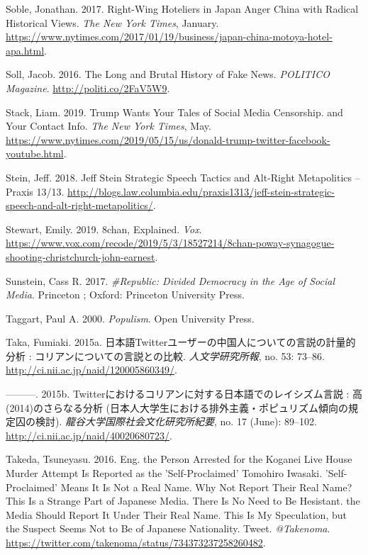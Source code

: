 \documentclass[10pt,british,A4paper,,openany]{memoir}
\begin{document}
\hypertarget{ref-soble_right-wing_2017}{}
Soble, Jonathan. 2017. Right-Wing Hoteliers in Japan Anger China with
Radical Historical Views. \emph{The New York Times}, January.
\url{https://www.nytimes.com/2017/01/19/business/japan-china-motoya-hotel-apa.html}.

\hypertarget{ref-soll_long_2016}{}
Soll, Jacob. 2016. The Long and Brutal History of Fake News.
\emph{POLITICO Magazine}. \url{http://politi.co/2FaV5W9}.

\hypertarget{ref-stack_trump_2019}{}
Stack, Liam. 2019. Trump Wants Your Tales of Social Media Censorship.
and Your Contact Info. \emph{The New York Times}, May.
\url{https://www.nytimes.com/2019/05/15/us/donald-trump-twitter-facebook-youtube.html}.

\hypertarget{ref-stein_jeff_2018}{}
Stein, Jeff. 2018. Jeff Stein Strategic Speech Tactics and Alt-Right
Metapolitics -- Praxis 13/13.
\url{http://blogs.law.columbia.edu/praxis1313/jeff-stein-strategic-speech-and-alt-right-metapolitics/}.

\hypertarget{ref-stewart_8chan_2019}{}
Stewart, Emily. 2019. 8chan, Explained. \emph{Vox}.
\url{https://www.vox.com/recode/2019/5/3/18527214/8chan-poway-synagogue-shooting-christchurch-john-earnest}.

\hypertarget{ref-sunstein_republic:_2017}{}
Sunstein, Cass R. 2017. \emph{\#Republic: Divided Democracy in the Age
of Social Media}. Princeton ; Oxford: Princeton University Press.

\hypertarget{ref-taggart_populism_2000}{}
Taggart, Paul A. 2000. \emph{Populism}. Open University Press.

\hypertarget{ref-taka_twitter_2015}{}
Taka, Fumiaki. 2015a.
日本語Twitterユーザーの中国人についての言説の計量的分析 :
コリアンについての言説との比較. \emph{人文学研究所報}, no. 53: 73--86.
\url{http://ci.nii.ac.jp/naid/120005860349/}.

\hypertarget{ref-taka_twitter_2015-1}{}
---------. 2015b.
Twitterにおけるコリアンに対する日本語でのレイシズム言説 :
高(2014)のさらなる分析
(日本人大学生における排外主義・ポピュリズム傾向の規定囚の検討).
\emph{龍谷大学国際社会文化研究所紀要}, no. 17 (June): 89--102.
\url{http://ci.nii.ac.jp/naid/40020680723/}.

\hypertarget{ref-takeda_eng._2016}{}
Takeda, Tsuneyasu. 2016. Eng. the Person Arrested for the Koganei Live
House Murder Attempt Is Reported as the 'Self-Proclaimed' Tomohiro
Iwasaki. 'Self-Proclaimed' Means It Is Not a Real Name. Why Not Report
Their Real Name? This Is a Strange Part of Japanese Media. There Is No
Need to Be Hesistant. the Media Should Report It Under Their Real Name.
This Is My Speculation, but the Suspect Seems Not to Be of Japanese
Nationality. Tweet. \emph{@Takenoma}.
\url{https://twitter.com/takenoma/status/734373237258260482}.
\end{document}
